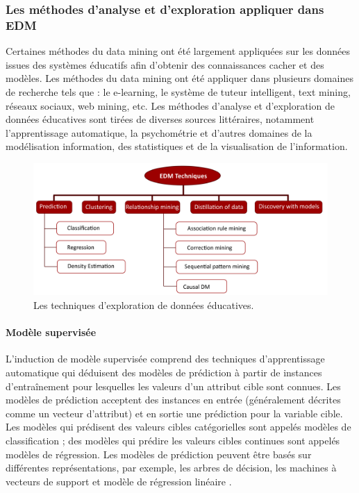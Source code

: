 \subsubsection{Les méthodes d’analyse et d’exploration appliquer dans EDM}
Certaines méthodes du data mining ont été largement appliquées sur les données issues des systèmes éducatifs afin d’obtenir des connaissances cacher et des modèles. Les méthodes du data mining ont été appliquer dans plusieurs domaines de recherche tels que : le e-learning, le système de tuteur intelligent, text mining, réseaux sociaux, web mining, etc. Les méthodes d’analyse et d'exploration de données éducatives sont tirées de diverses sources littéraires, notamment l'apprentissage automatique, la psychométrie et d'autres domaines de la modélisation information, des statistiques et de la visualisation de l'information. \\

\begin{figure}[H]
	\begin{center}
		\includegraphics[width=\textwidth]{images/chapitre1/edm techniques}
	\end{center}
	\caption{Les techniques d'exploration de données éducatives.}
\end{figure}

\paragraph{Modèle supervisée \\}

L'induction de modèle supervisée comprend des techniques d'apprentissage automatique qui déduisent des modèles de prédiction à partir de instances d'entraînement pour lesquelles les valeurs d'un attribut cible sont connues. Les modèles de prédiction acceptent des
instances en entrée (généralement décrites comme un vecteur d'attribut) et en sortie une prédiction pour la variable cible. Les modèles qui prédisent des valeurs cibles catégorielles sont appelés modèles de classification ; des modèles qui prédire les valeurs cibles continues sont appelés modèles de régression. Les modèles de prédiction peuvent être basés sur
différentes représentations, par exemple, les arbres de décision, les machines à vecteurs de support et modèle de régression linéaire \cite{Scheuer2012}.

